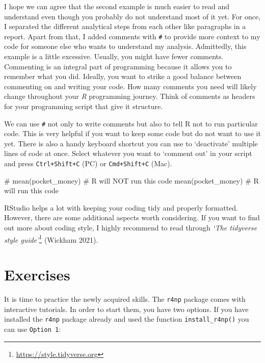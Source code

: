 \documentclass[
  letterpaper,
]{krantz}
\makeatletter
\newenvironment{Shaded}{\begin{snugshade}}{\end{snugshade}}
\newcommand{\CommentTok}[1]{\textcolor[rgb]{0.37,0.37,0.37}{#1}}
\newcommand{\FunctionTok}[1]{\textcolor[rgb]{0.28,0.35,0.67}{#1}}
\newcommand{\NormalTok}[1]{\textcolor[rgb]{0.00,0.23,0.31}{#1}}
\renewcommand{\href}[2]{#2\footnote{\url{#1}}}
\newenvironment{kframe}{%
\medskip{}
\setlength{\fboxsep}{.8em}
 \def\at@end@of@kframe{}%
 \ifinner\ifhmode%
  \def\at@end@of@kframe{\end{minipage}}%
  \begin{minipage}{\columnwidth}%
 \fi\fi%
 \def\FrameCommand##1{\hskip\@totalleftmargin \hskip-\fboxsep
 \colorbox{shadecolor}{##1}\hskip-\fboxsep
     \hskip-\linewidth \hskip-\@totalleftmargin \hskip\columnwidth}%
 \MakeFramed {\advance\hsize-\width
   \@totalleftmargin\z@ \linewidth\hsize
   \@setminipage}}%
 {\par\unskip\endMakeFramed%
 \at@end@of@kframe}
\renewenvironment{Shaded}{\begin{kframe}}{\end{kframe}}
\makeatother
\begin{document}
I hope we can agree that the second example is much easier to read and
understand even though you probably do not understand most of it yet.
For once, I separated the different analytical steps from each other
like paragraphs in a report. Apart from that, I added comments with
\texttt{\#} to provide more context to my code for someone else who
wants to understand my analysis. Admittedly, this example is a little
excessive. Usually, you might have fewer comments. Commenting is an
integral part of programming because it allows you to remember what you
did. Ideally, you want to strike a good balance between commenting on
and writing your code. How many comments you need will likely change
throughout your \emph{R} programming journey. Think of comments as
headers for your programming script that give it structure.

We can use \texttt{\#} not only to write comments but also to tell R not
to run particular code. This is very helpful if you want to keep some
code but do not want to use it yet. There is also a handy keyboard
shortcut you can use to `deactivate' multiple lines of code at once.
Select whatever you want to `comment out' in your script and press
\texttt{Ctrl+Shift+C} (PC) or \texttt{Cmd+Shift+C} (Mac).

\begin{Shaded}
\begin{Highlighting}[]
\CommentTok{\# mean(pocket\_money) \# R will NOT run this code}
\FunctionTok{mean}\NormalTok{(pocket\_money)   }\CommentTok{\# R will run this code}
\end{Highlighting}
\end{Shaded}

RStudio helps a lot with keeping your coding tidy and properly
formatted. However, there are some additional aspects worth considering.
If you want to find out more about coding style, I highly recommend to
read through \href{https://style.tidyverse.org}{\emph{`The tidyverse
style guide'}} (Wickham 2021).\\

\section{Exercises}\label{sec-exercises-r_basics}

It is time to practice the newly acquired skills. The \texttt{r4np}
package comes with interactive tutorials. In order to start them, you
have two options. If you have installed the \texttt{r4np} package
already and used the function \texttt{install\_r4np()} you can use
\texttt{Option\ 1}:
\end{document}
